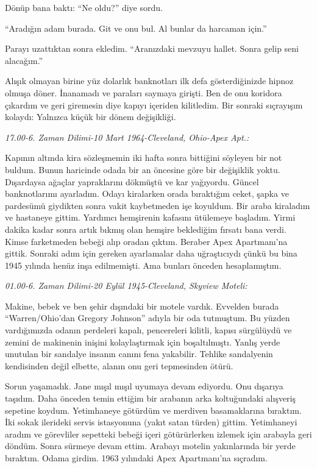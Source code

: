 Dönüp bana baktı: ``Ne oldu?'' diye sordu.

``Aradığın adam burada. Git ve onu bul. Al bunlar da harcaman için.''

Parayı uzattıktan sonra ekledim. ``Aranızdaki mevzuyu hallet. Sonra gelip seni
alacağım.''

Alışık olmayan birine yüz dolarlık banknotları ilk defa gösterdiğinizde hipnoz
olmuşa döner. İnanamadı ve paraları saymaya girişti. Ben de onu koridora
çıkardım ve geri giremesin diye kapıyı içeriden kilitledim. Bir sonraki
sıçrayışım kolaydı: Yalnızca küçük bir dönem değişikliği.

\noindent\emph{17.00-6. Zaman Dilimi-10 Mart 1964-Cleveland, Ohio-Apex Apt.:}

Kapının altında kira sözleşmemin iki hafta sonra bittiğini söyleyen bir not
buldum. Bunun haricinde odada bir an öncesine göre bir değişiklik yoktu.
Dışardaysa ağaçlar yapraklarını dökmüştü ve kar yağıyordu. Güncel banknotlarımı
ayarladım. Odayı kiralarken orada bıraktığım ceket, şapka ve pardesümü
giydikten sonra vakit kaybetmeden işe koyuldum. Bir araba kiraladım ve
hastaneye gittim. Yardımcı hemşirenin kafasını ütülemeye başladım. Yirmi dakika
kadar sonra artık bıkmış olan hemşire beklediğim fırsatı bana verdi. Kimse
farketmeden bebeği alıp oradan çıktım. Beraber Apex Apartmanı'na gittik.
Sonraki adım için gereken ayarlamalar daha uğraştıcıydı çünkü bu bina 1945
yılında henüz inşa edilmemişti. Ama bunları önceden hesaplamıştım.

\noindent\emph{01.00-6. Zaman Dilimi-20 Eylül 1945-Cleveland, Skyview Moteli:}

Makine, bebek ve ben şehir dışındaki bir motele vardık. Evvelden burada
``Warren/Ohio'dan Gregory Johnson'' adıyla bir oda tutmuştum. Bu yüzden
vardığımızda odanın perdeleri kapalı, pencereleri kilitli, kapısı sürgülüydü ve
zemini de makinenin inişini kolaylaştırmak için boşaltılmıştı. Yanlış yerde
unutulan bir sandalye insanın canını fena yakabilir. Tehlike sandalyenin
kendisinden değil elbette, alanın onu geri tepmesinden ötürü.

Sorun yaşamadık. Jane mışıl mışıl uyumaya devam ediyordu. Onu dışarıya taşıdım.
Daha önceden temin ettiğim bir arabanın arka koltuğundaki alışveriş sepetine
koydum. Yetimhaneye götürdüm ve merdiven basamaklarına bıraktım. İki sokak
ilerideki servis istasyonuna (yakıt satan türden) gittim. Yetimhaneyi aradım ve
görevliler sepetteki bebeği içeri götürürlerken izlemek için arabayla geri
döndüm. Sonra sürmeye devam ettim. Arabayı motelin yakınlarında bir yerde
bıraktım. Odama girdim. 1963 yılındaki Apex Apartmanı'na sıçradım.

